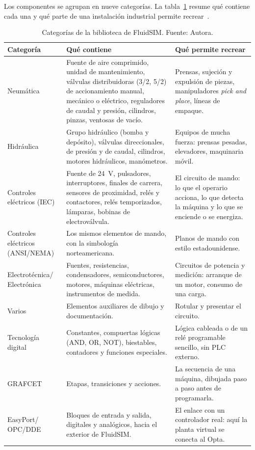 \documentclass[12pt,a4paper]{article}
\begin{document}
Los componentes se agrupan en nueve categorías. La
tabla~\ref{tab:fs_categorias} resume qué contiene cada una y qué parte de una
instalación industrial permite recrear~\cite{fluidsimlib}.

\begin{table}[!htbp]
\centering
\caption{Categorías de la biblioteca de FluidSIM. Fuente: Autora.}
\label{tab:fs_categorias}
\linespread{1}\small\selectfont
\renewcommand{\arraystretch}{1.3}
\begin{tabularx}{\linewidth}{>{\raggedright\arraybackslash}p{3.4cm} X X}
\toprule
\textbf{Categoría} & \textbf{Qué contiene} & \textbf{Qué permite recrear} \\
\midrule
Neumática &
Fuente de aire comprimido, unidad de mantenimiento, válvulas
distribuidoras (3/2, 5/2) de accionamiento manual, mecánico o eléctrico,
reguladores de caudal y presión, cilindros, pinzas, ventosas de vacío. &
Prensas, sujeción y expulsión de piezas, manipuladores
\textit{pick and place}, líneas de empaque. \\
Hidráulica &
Grupo hidráulico (bomba y depósito), válvulas direccionales, de presión y
de caudal, cilindros, motores hidráulicos, manómetros. &
Equipos de mucha fuerza: prensas pesadas, elevadores, maquinaria móvil. \\
Controles eléctricos (IEC) &
Fuente de 24~V, pulsadores, interruptores, finales de carrera, sensores de
proximidad, relés y contactores, relés temporizados, lámparas, bobinas de
electroválvula. &
El circuito de mando: lo que el operario acciona, lo que detecta la
máquina y lo que se enciende o se energiza. \\
Controles eléctricos (ANSI/NEMA) &
Los mismos elementos de mando, con la simbología norteamericana. &
Planos de mando con estilo estadounidense. \\
Electrotécnica/ Electrónica &
Fuentes, resistencias, condensadores, semiconductores, motores, máquinas
eléctricas, instrumentos de medida. &
Circuitos de potencia y medición: arranque de un motor, consumo de una
carga. \\
Varios &
Elementos auxiliares de dibujo y documentación. &
Rotular y presentar el circuito. \\
Tecnología digital &
Constantes, compuertas lógicas (AND, OR, NOT), biestables, contadores y
funciones especiales. &
Lógica cableada o de un relé programable sencillo, sin PLC externo. \\
GRAFCET &
Etapas, transiciones y acciones. &
La secuencia de una máquina, dibujada paso a paso antes de programarla. \\
EasyPort/ OPC/DDE &
Bloques de entrada y salida, digitales y analógicos, hacia el exterior
de FluidSIM. &
El enlace con un controlador real: aquí la planta virtual se conecta al
Opta. \\
\bottomrule
\end{tabularx}
\end{table}
\end{document}
